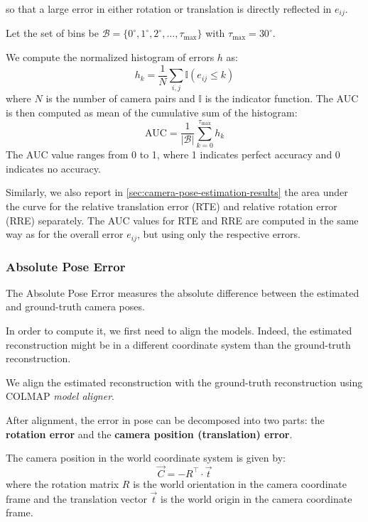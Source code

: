 so that a large error in either rotation or translation is directly reflected in \(e_{ij}\).

Let the set of bins be \(\mathcal{B} = \{0^{\circ}, 1^{\circ}, 2^{\circ}, \ldots, \tau_{\max}\}\) with \(\tau_{\max}=30^{\circ}\).

We compute the normalized histogram of errors \(h\) as:
\begin{equation}
    h_k = \frac{1}{N} \sum_{i,j} \mathbb{I}(e_{ij} \leq k)
\end{equation}
where \(N\) is the number of camera pairs and \(\mathbb{I}\) is the indicator function.
The AUC is then computed as mean of the cumulative sum of the histogram:
\begin{equation}
    \text{AUC} = \frac{1}{|\mathcal{B}|} \sum_{k=0}^{\tau_{\max}} h_k
\end{equation}
The AUC value ranges from 0 to 1, where 1 indicates perfect accuracy and 0 indicates no accuracy.

Similarly, we also report in \ref{sec:camera-pose-estimation-results} the area under the curve for the relative translation error (RTE) and relative rotation error (RRE) separately.
The AUC values for RTE and RRE are computed in the same way as for the overall error \(e_{ij}\), but using only the respective errors.


\subsubsection{Absolute Pose Error}
The Absolute Pose Error measures the absolute difference between the estimated and ground-truth camera poses.

In order to compute it, we first need to align the models. Indeed, the estimated reconstruction might be in a different coordinate system than the ground-truth reconstruction.

We align the estimated reconstruction with the ground-truth reconstruction using COLMAP \textit{model aligner}.

After alignment, the error in pose can be decomposed into two parts: the \textbf{rotation error} and the \textbf{camera position (translation) error}.

The camera position in the world coordinate system is given by:
\begin{equation}
    \vec{C} = -R^\top \cdot \vec{t}
\end{equation}
where the rotation matrix $R$ is the world orientation in the camera coordinate frame and the translation vector $\vec{t}$ is the world origin in the camera coordinate frame.


